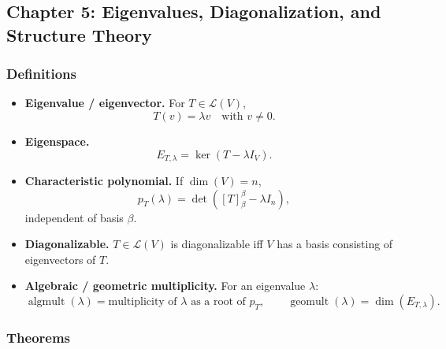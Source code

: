 \subsection*{Chapter 5: Eigenvalues, Diagonalization, and Structure Theory}

\subsubsection*{Definitions}

\begin{itemize}[leftmargin=*]
\item \textbf{Eigenvalue / eigenvector.} For $T\in\mathcal L(V)$,
\[
T(v)=\lambda v\quad\text{with }v\neq 0.
\]

\item \textbf{Eigenspace.}
\[
E_{T,\lambda}=\ker(T-\lambda I_V).
\]

\item \textbf{Characteristic polynomial.} If $\dim(V)=n$,
\[
p_T(\lambda)=\det([T]^{\beta}_{\beta}-\lambda I_n),
\]
independent of basis $\beta$.

\item \textbf{Diagonalizable.} $T\in\mathcal L(V)$ is diagonalizable iff $V$ has a basis consisting of eigenvectors of $T$.

\item \textbf{Algebraic / geometric multiplicity.} For an eigenvalue $\lambda$:
\[
\operatorname{algmult}(\lambda)=\text{multiplicity of }\lambda\text{ as a root of }p_T,
\qquad
\operatorname{geomult}(\lambda)=\dim(E_{T,\lambda}).
\]
\end{itemize}

\subsubsection*{Theorems}

